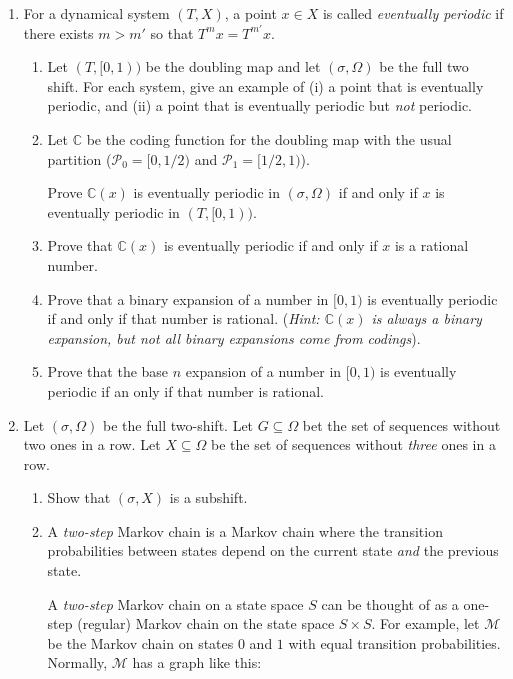 \documentclass[letter]{article}
\newcommand{\setheader}[6]{
	\lhead{{\sc #1}\\{\sc #2} ({\small \it \today})}
	\rhead{
		{\bf #3} 
		\ifthenelse{\equal{#4}{}}{}{(#4)}\\
		{\bf #5} 
		\ifthenelse{\equal{#6}{}}{}{(#6)}%
	}
}
\newcommand{\C}{\mathbb{C}}
\begin{document}
	\setheader{MAT335}{Homework 4}{Due: 11:59pm April 6}{}{}{}

	\begin{enumerate}
		\item For a dynamical system $(T,X)$, a point $x\in X$ is called \emph{eventually periodic} if there 
			exists $m>m'$ so that $T^mx=T^{m'}x$.
		\begin{enumerate}
			\item Let $(T,[0,1))$ be the doubling map and let $(\sigma,\Omega)$ be the full two shift.
				For each system, give an example of (i) a point that is eventually periodic, and (ii)
				a point that is eventually periodic but \emph{not} periodic.
			\item Let $\C$ be the coding function for the doubling map with the usual partition ($\mathcal P_0=[0,1/2)$
				and $\mathcal P_1=[1/2,1)$).

				Prove $\C(x)$ is eventually periodic in $(\sigma, \Omega)$ if and only if $x$ is eventually
				periodic in $(T,[0,1))$.
			\item Prove that $\C(x)$ is eventually periodic if and only if $x$ is a rational number.
			\item Prove that a binary expansion of a number in $[0,1)$ is eventually periodic if and only
				if that number is rational. (\emph{Hint: $\C(x)$ is always a binary expansion, but not all
				binary expansions come from codings}).
			\item Prove that the base $n$ expansion of a number in $[0,1)$ is eventually periodic if an only if that
				number is rational.
		\end{enumerate}

		\item Let $(\sigma, \Omega)$ be the full two-shift. Let $G\subseteq\Omega$ 
			bet the set of sequences without two ones in a row.
			Let $X\subseteq \Omega$ be the set of sequences without \emph{three} ones in a row.
			\begin{enumerate}
				\item Show that $(\sigma, X)$ is a subshift.
				\item A \emph{two-step} Markov chain is a Markov chain where the transition probabilities
					between states depend on the current state \emph{and} the previous state. 
					
					A \emph{two-step} Markov chain on a state space $S$ can be thought of as a 
					one-step (regular) Markov chain on the state space $S\times S$. For example, let
					$\mathcal M$ be the Markov
					chain on states $0$ and $1$ with equal transition probabilities.
					Normally, $\mathcal M$ has a graph like this:


\end{enumerate}
\end{enumerate}
\end{document}
